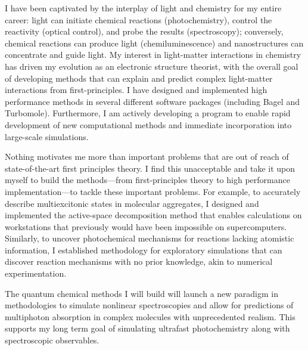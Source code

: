 \documentclass{nihbiosketch}
\begin{document}
\begin{statement}
I have been captivated by the interplay of light and chemistry for my entire
career: light can initiate chemical reactions (photochemistry),
control the reactivity (optical control), and probe
the results (spectroscopy); conversely, chemical reactions can produce light
(chemiluminescence) and nanostructures can concentrate and guide light.
My interest in light-matter interactions in chemistry has driven my
evolution as an electronic structure theorist, with the overall goal of
developing methods that can explain and predict complex light-matter
interactions from first-principles. I have designed and implemented high
performance methods in several
different software packages (including Bagel and Turbomole). Furthermore, I am
actively developing a program to enable rapid development of new computational
methods and immediate incorporation into large-scale simulations.

Nothing motivates me more than important problems that are out of reach of
state-of-the-art first principles theory. I find this unacceptable and take it
upon myself to build the methods---from first-principles theory to high
performance implementation---to tackle these important problems. For example, to
accurately describe multiexcitonic states in molecular aggregates, I designed
and implemented the active-space decomposition method that enables calculations
on workstations that previously would have been impossible on supercomputers.
Similarly, to uncover photochemical mechanisms for reactions lacking atomistic
information, I established methodology for exploratory simulations that can
discover reaction mechanisms with no prior knowledge, akin to numerical experimentation.

The quantum chemical methods I will build will launch a new paradigm
in methodologies to simulate nonlinear spectroscopies and allow for
predictions of multiphoton absorption in complex molecules with unprecedented realism.
This supports my long term goal of simulating ultrafast photochemistry
along with spectroscopic observables.

\begin{bibunit}[nih]
\nocite*{Parker2013JCP021108,Parker2018JCTC807,Parker2019}
\renewcommand{\refname}{\vspace{-2em}}
\end{bibunit}

\end{statement}

\end{document}
